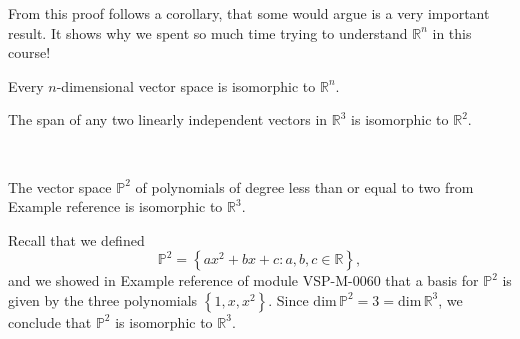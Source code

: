 \documentclass{ximera}
\newcommand{\RR}{\mathbb{R}}
\begin{document}
From this proof follows a corollary, that some would argue is a very important result.  It shows why we spent so much time trying to understand $\RR^n$ in this course!

\begin{corollary}\label{cor:ndimisotorn}
Every $n$-dimensional vector space is isomorphic to $\RR^n$.
\end{corollary}

\begin{example}
The span of any two linearly independent vectors in $\RR^3$ is isomorphic to $\RR^2$. %


\begin{image}
~~~~~~~~~~~~~
  \label{fig:planeisoplane} 
  \end{image}

\end{example}

\begin{example}
The vector space $\mathbb{P}^2$ of polynomials of degree less than or equal to two from Example {\color{red} reference} is isomorphic to $\RR^3$.
\end{example}

\begin{explanation}
Recall that we defined $$\mathbb{P}^2=\left\{ax^2+bx+c : a,b,c \in \mathbb{R} \right\},$$ and we showed in Example {\color{red} reference} of module VSP-M-0060 that a basis for $\mathbb{P}^2$ is given by the three polynomials $\left\{1,x,x^2\right\}$.  Since $\text{dim}\,\mathbb{P}^2=3=\text{dim}\,\RR^3$, we conclude that $\mathbb{P}^2$ is isomorphic to $\RR^3$.
\end{explanation}
\end{document}
